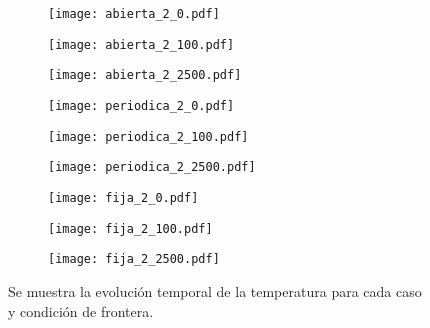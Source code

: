\documentclass[a4paper]{article}
\begin{document}
	\begin{figure}\ContinuedFloat
		\centering
		\begin{subfigure}{\textwidth}
			\centering
			\texttt{[image: abierta\_2\_0.pdf]}
			\caption{\label{fig:abierta_2_0}}
		\end{subfigure}
		\begin{subfigure}{\textwidth}
			\centering
			\texttt{[image: abierta\_2\_100.pdf]}
			\caption{\label{fig:abierta_2_100}}
		\end{subfigure}
		\begin{subfigure}{\textwidth}
			\centering
			\texttt{[image: abierta\_2\_2500.pdf]}
			\caption{\label{fig:abierta_2_2500}}
		\end{subfigure}
	\end{figure}
	\begin{figure}\ContinuedFloat
		\centering
		\begin{subfigure}{\textwidth}
			\centering
			\texttt{[image: periodica\_2\_0.pdf]}
			\caption{\label{fig:periodica_2_0}}
		\end{subfigure}
		\begin{subfigure}{\textwidth}
			\centering
			\texttt{[image: periodica\_2\_100.pdf]}
			\caption{\label{fig:periodica_2_100}}
		\end{subfigure}
		\begin{subfigure}{\textwidth}
			\centering
			\texttt{[image: periodica\_2\_2500.pdf]}
			\caption{\label{fig:periodica_2_2500}}
		\end{subfigure}
	\end{figure}
	\begin{figure}\ContinuedFloat
		\centering
		\begin{subfigure}{\textwidth}
			\centering
			\texttt{[image: fija\_2\_0.pdf]}
			\caption{\label{fig:fija_2_0}}
		\end{subfigure}
		\begin{subfigure}{\textwidth}
			\centering
			\texttt{[image: fija\_2\_100.pdf]}
			\caption{\label{fig:fija_2_100}}
		\end{subfigure}
		\begin{subfigure}{\textwidth}
			\centering
			\texttt{[image: fija\_2\_2500.pdf]}
			\caption{\label{fig:fija_2_2500}}
		\end{subfigure}
		\caption{\label{fig:Tvs.x} Se muestra la evoluci\'on temporal de la temperatura para cada caso y condici\'on de frontera.}
	\end{figure}
\end{document}
